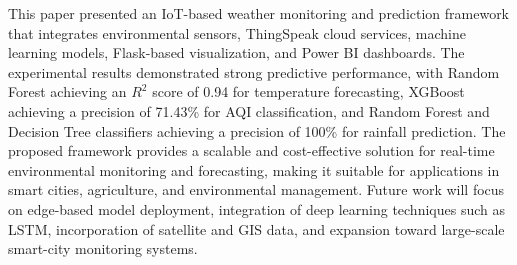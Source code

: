 \documentclass[conference]{IEEEtran}
\begin{document}
This paper presented an IoT-based weather monitoring and prediction framework that integrates environmental sensors, ThingSpeak cloud services, machine learning models, Flask-based visualization, and Power BI dashboards. The experimental results demonstrated strong predictive performance, with Random Forest achieving an $R^2$ score of 0.94 for temperature forecasting, XGBoost achieving a precision of 71.43\% for AQI classification, and Random Forest and Decision Tree classifiers achieving a precision of 100\% for rainfall prediction. The proposed framework provides a scalable and cost-effective solution for real-time environmental monitoring and forecasting, making it suitable for applications in smart cities, agriculture, and environmental management. Future work will focus on edge-based model deployment, integration of deep learning techniques such as LSTM, incorporation of satellite and GIS data, and expansion toward large-scale smart-city monitoring systems.
\end{document}
